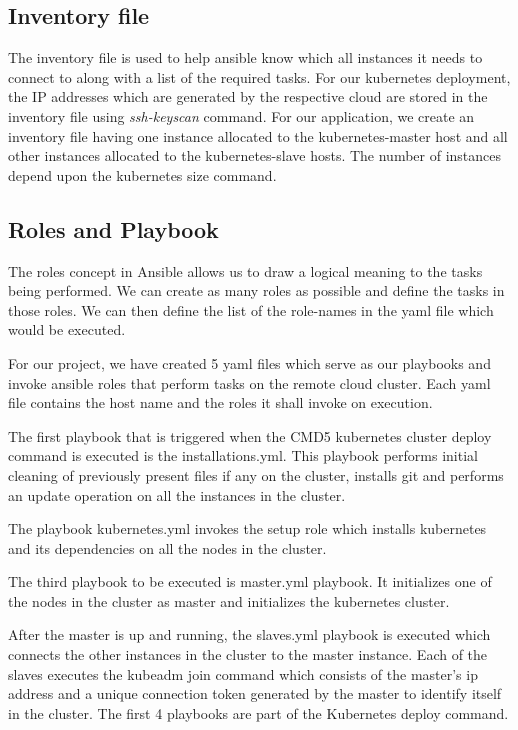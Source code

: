 \documentclass[9pt,twocolumn,twoside]{../../styles/osajnl}
\begin{document}
\subsection{Inventory file}
The inventory file is used to help ansible know which all instances it
needs to connect to along with a list of the required tasks. For our
kubernetes deployment, the IP addresses which are generated by the
respective cloud are stored in the inventory file using
\emph{ssh-keyscan} command. For our application, we create an
inventory file having one instance allocated to the kubernetes-master
host and all other instances allocated to the kubernetes-slave
hosts. The number of instances depend upon the kubernetes size
command.

\subsection{Roles and Playbook}
The roles concept in Ansible allows us to draw a logical meaning to the
tasks being performed. We can create as many roles as possible and
define the tasks in those roles. We can then define the list of the
role-names in the yaml file which would be executed.\newline

\noindent
For our project, we have created 5 yaml files which serve as our
playbooks and invoke ansible roles that perform tasks on the remote
cloud cluster. Each yaml file contains the host name and the roles it
shall invoke on execution.\newline

\noindent
The first playbook that is triggered when the CMD5 kubernetes cluster
deploy command is executed is the installations.yml. This playbook
performs initial cleaning of previously present files if any on the
cluster, installs git and performs an update operation on all the
instances in the cluster.\newline

\noindent
The playbook kubernetes.yml invokes the setup role which installs
kubernetes and its dependencies on all the nodes in the
cluster. \newline

\noindent
The third playbook to be executed is master.yml playbook. It
initializes one of the nodes in the cluster as master and initializes
the kubernetes cluster.\newline

\noindent
After the master is up and running, the slaves.yml playbook is
executed which connects the other instances in the cluster to the
master instance. Each of the slaves executes the kubeadm join command
which consists of the master's ip address and a unique connection
token generated by the master to identify itself in the cluster. The
first 4 playbooks are part of the Kubernetes deploy command.\newline
\end{document}
